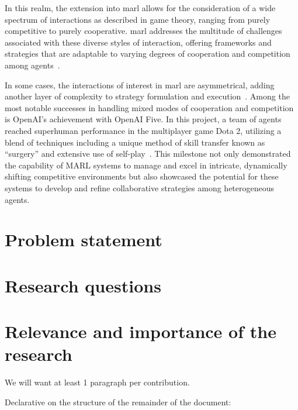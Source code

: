 In this realm, the extension into \gls{marl} allows for the consideration of a wide spectrum of 
interactions as described in game theory, ranging from purely competitive to purely cooperative. 
\gls{marl} addresses the multitude of challenges associated with these diverse styles of interaction,
offering frameworks and strategies that are adaptable to varying degrees of cooperation and 
competition among agents~\cite{lowe2020}.

In some cases, the interactions of interest in \gls{marl} are asymmetrical, 
adding another layer of complexity to strategy formulation and execution~\cite*{sun2023}.
Among the most notable successes in handling mixed modes of cooperation and competition is 
OpenAI's achievement with OpenAI Five. In this project, a team of agents reached superhuman 
performance in the multiplayer game Dota 2, utilizing a blend of techniques including a unique 
method of skill transfer known as ``surgery'' and extensive use of self-play~\cite{berner2019}.
This milestone not only demonstrated the capability of MARL systems to manage and excel in intricate, 
dynamically shifting competitive environments but also showcased the potential for these systems to 
develop and refine collaborative strategies among heterogeneous agents.





\section{Problem statement}%
\label{sec:problem_statement}

\section{Research questions}%
\label{sec:research_question}

\section{Relevance and importance of the research}%
\label{sec:relevance_and_importance}



\begin{tcolorbox}[colback=blue!5,colframe=blue!30!black,title=Note to Editor]
    We will want at least 1 paragraph per contribution.

    Declarative on the structure of the remainder of the document:
\end{tcolorbox}

